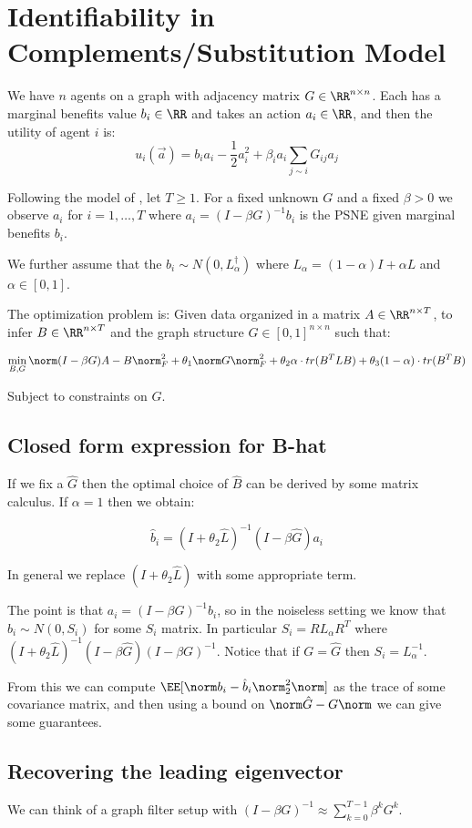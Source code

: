 \section{Identifiability in Complements/Substitution Model}

We have $n$ agents on a graph with adjacency matrix $G \in \RR^{n \times n}$. Each has a marginal benefits value $b_i \in \RR$ and takes an action $a_i \in \RR$, and then the utility of agent $i$ is:
\[
u_i(\vec{a}) = b_i a_i - \frac 1 2 a_i^2 + \beta_i a_i \sum_{j \sim i} G_{ij} a_j
\]

Following the model of \cite{leng2020learning}, let $T \geq 1$. For a fixed unknown $G$ and a fixed $\beta > 0$ we observe $a_i$ for $i = 1, \dots, T$ where $a_i = (I - \beta G)^{-1} b_i$ is the PSNE given marginal benefits $b_i$. 

We further assume that the $b_i \sim N(0, L_\alpha^\dagger)$ where $L_\alpha = (1 - \alpha)I + \alpha L$ and $\alpha \in [0, 1]$. 

The optimization problem is: Given data organized in a matrix $A \in \RR^{n \times T}$, to infer $B \in \RR^{n \times T}$ and the graph structure $G \in [0, 1]^{n \times n}$ such that: 

\[
\min\limits_{B, G} \norm (I - \beta G) A - B \norm_F^2 + \theta_1 \norm G \norm_F^2 
+ \theta_2 \alpha \cdot tr(B^T L B) 
+ \theta_3 (1 - \alpha) \cdot tr(B^T B)
\]

Subject to constraints on $G$. 


\subsection{Closed form expression for B-hat}

If we fix a $\hat G$ then the optimal choice of $\hat B$ can be derived by some matrix calculus. If $\alpha = 1$ then we obtain: 

$$\hat{b}_i = (I + \theta_2 \hat{L})^{-1} (I - \beta \hat G) a_i$$

In general we replace $(I + \theta_2 \hat{L})$ with some appropriate term. 

The point is that $a_i  = (I - \beta G)^{-1} b_i$, so in the noiseless setting we know that $\hat{b}_i \sim N(0, S_i)$ for some $S_i$ matrix. In particular $S_i = R L_\alpha R^T$ where $(I + \theta_2 \hat{L})^{-1} (I - \beta \hat G) (I - \beta G)^{-1}$. Notice that if $G = \hat G$ then $S_i = L_\alpha^{-1}$. 

From this we can compute $\EE[\norm b_i - \hat{b}_i \norm_2^2 \norm]$ as the trace of some covariance matrix, and then using a bound on $\norm \hat{G} - G \norm$ we can give some guarantees. 


\subsection{Recovering the leading eigenvector}

We can think of a graph filter setup with $(I - \beta G)^{-1} \approx \sum_{k = 0}^{T - 1} \beta^k G^k$. 
